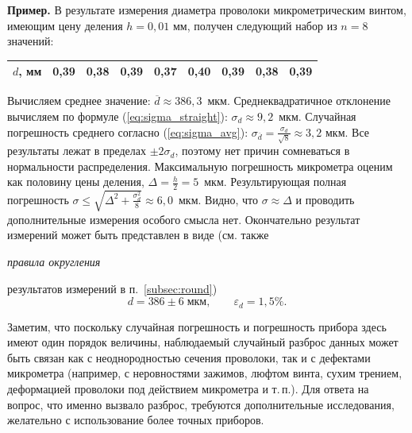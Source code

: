 \documentclass[10pt]{article}
\begin{document}
{\footnotesize
\textbf{Пример.} В результате измерения диаметра проволоки микрометрическим винтом,
имеющим цену деления $h=0,01$ мм, получен следующий набор из $n=8$ значений:\par
\begin{tabular}{|c|c|c|c|c|c|c|c|c|}
\hline 
{\footnotesize{}$d$, мм} & {\footnotesize{}0,39} & {\footnotesize{}0,38} & {\footnotesize{}0,39} & {\footnotesize{}0,37} & {\footnotesize{}0,40} & {\footnotesize{}0,39} & {\footnotesize{}0,38} & {\footnotesize{}0,39}\tabularnewline
\hline 
\end{tabular}\par
Вычисляем среднее значение: $\overline{d}\approx386{,}3$~мкм.
Среднеквадратичное отклонение вычисляем по формуле (\ref{eq:sigma_straight}):
$\sigma_{d}\approx9{,}2$~мкм. Случайная погрешность среднего согласно
(\ref{eq:sigma_avg}): $\sigma_{\overline{d}}=\frac{\sigma_{d}}{\sqrt{8}}\approx3{,}2$
мкм. Все результаты лежат в пределах $\pm2\sigma_{d}$, поэтому нет
причин сомневаться в нормальности распределения. Максимальную погрешность
микрометра оценим как половину цены деления, $\Delta=\frac{h}{2}=5$~мкм.
Результирующая полная погрешность $\sigma\le\sqrt{\Delta^{2}+\frac{\sigma_{d}^{2}}{8}}\approx6{,}0$~мкм.
Видно, что $\sigma\approx\Delta$ и проводить дополнительные измерения
особого смысла нет. Окончательно результат измерений может быть представлен
в виде (см. также }\emph{\footnotesize{}правила округления}{\footnotesize{}
результатов измерений в п.~\ref{subsec:round})
\[
d=386\pm6\;\text{мкм},\qquad\varepsilon_{d}=1{,}5\%.
\]

Заметим, что поскольку случайная погрешность и погрешность
прибора здесь имеют один порядок величины, наблюдаемый случайный разброс
данных может быть связан как с неоднородностью сечения проволоки,
так и с дефектами микрометра (например, с неровностями зажимов, люфтом
винта, сухим трением, деформацией проволоки под действием микрометра
и т.\,п.). Для ответа на вопрос, что именно вызвало разброс, требуются
дополнительные исследования, желательно с использование более точных
приборов.\par
}%
\end{document}
